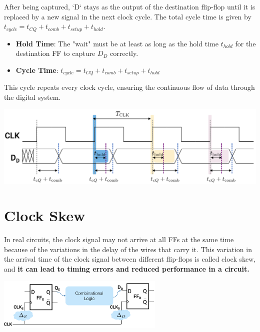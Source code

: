 \documentclass[12pt,openany]{book}
\begin{document}
\begin{minipage}{0.55\textwidth}
    After being captured, `D` stays as the output of the destination flip-flop until it is replaced by a new signal in the next clock cycle. The total cycle time is given by $t_{cycle} = t_{CQ} + t_{comb} + t_{setup} + t_{hold}$.
    \begin{itemize}
        \item[] \textbf{Hold Time}: The "wait" must be at least as long as the hold time $t_{hold}$ for the destination FF to capture $D_D$ correctly.
        \item[] \textbf{Cycle Time}: $t_{cycle} = t_{CQ} + t_{comb} + t_{setup} + t_{hold}$
    \end{itemize}
    This cycle repeats every clock cycle, ensuring the continuous flow of data through the digital system.
\end{minipage}
\hfill
\vline
\hfill
\begin{minipage}{0.4\textwidth}
    \centering
    \includegraphics[width=1.3\textwidth]{circuits/15.4.6.png}
\end{minipage}


\newpage
\section{Clock Skew}

\begin{justify}
	In real circuits, the clock signal may not arrive at all FFs at the same time
	because of the variations in the delay of the wires that carry it. 
	\newline 
	This variation in the arrival time of the clock signal between different flip-flops is called clock skew, and \textbf{it can lead to timing errors and reduced performance in a circuit.}
\end{justify}
\begin{center}

	\includegraphics[width=0.6\textwidth]{circuits/15.5.png}
\end{center}
\end{document}
